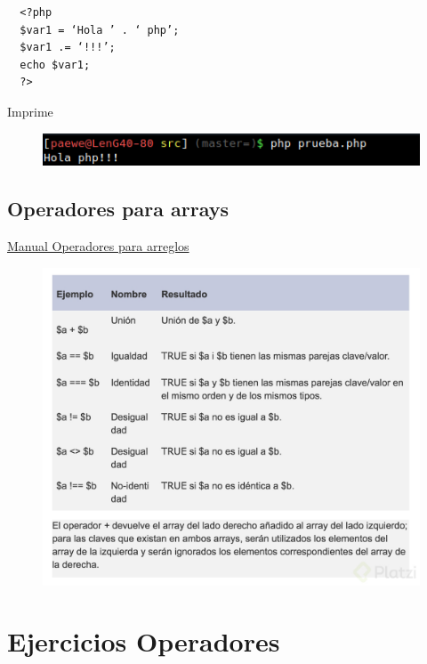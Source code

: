 \documentclass{article}
\begin{document}
\begin{verbatim}
  <?php
  $var1 = ‘Hola ’ . ‘ php’;
  $var1 .= ‘!!!’;
  echo $var1;
  ?>
\end{verbatim}

Imprime\\

\begin{figure}[h!]
  \centering
  \includegraphics[scale=0.75]{./Pictures/027_operadores.png}
\end{figure}

\newpage

\subsection*{Operadores para arrays}%
\href{http://php.net/manual/es/language.operators.array.php}{Manual Operadores para arreglos}\\

\begin{figure}[h!]
  \centering
  \includegraphics[scale=0.3]{./Pictures/028_operadores.jpg}
\end{figure}

\section{Ejercicios Operadores}%
\end{document}
